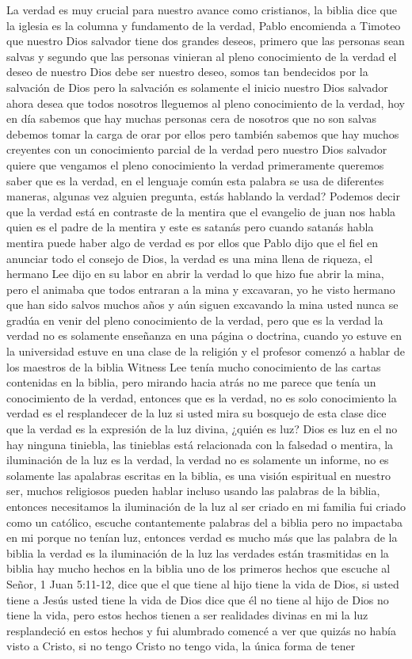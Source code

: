 \documentclass[12pt]{article}
\begin{document}
La verdad es muy crucial para nuestro avance como cristianos, la biblia dice que la iglesia es la columna y fundamento de la verdad, Pablo encomienda a Timoteo que nuestro Dios salvador tiene dos grandes deseos, primero que las personas sean salvas y segundo que las personas vinieran al pleno conocimiento de la verdad el deseo de nuestro Dios debe ser nuestro deseo, somos tan bendecidos por la salvación de Dios pero la salvación es solamente el inicio nuestro Dios salvador ahora desea que todos nosotros lleguemos al pleno conocimiento de la verdad, hoy en día sabemos que hay muchas personas cera de nosotros que no son salvas debemos tomar la carga de orar por ellos pero también sabemos que hay muchos creyentes con un conocimiento parcial de la verdad pero nuestro Dios salvador quiere que vengamos el pleno conocimiento la verdad primeramente queremos saber que es la verdad, en el lenguaje común esta palabra se usa de diferentes maneras, algunas vez alguien pregunta, estás hablando la verdad? Podemos decir que la verdad está en contraste de la mentira que el evangelio de juan nos habla quien es el padre de la mentira y este es satanás pero cuando satanás habla mentira puede haber algo de verdad es por ellos que Pablo dijo que el fiel en anunciar todo el consejo de Dios, la verdad es una mina llena de riqueza, el hermano Lee dijo en su labor en abrir la verdad lo que hizo fue abrir la mina, pero el animaba que todos entraran a la mina y excavaran, yo he visto hermano que han sido salvos muchos años y aún siguen excavando la mina usted nunca se gradúa en venir del pleno conocimiento de la verdad, pero que es la verdad la verdad no es solamente enseñanza en una página o doctrina, cuando yo estuve en la universidad estuve en una clase de la religión y el profesor comenzó a hablar de los maestros de la biblia Witness Lee tenía mucho conocimiento de las cartas contenidas en la biblia, pero mirando hacia atrás no me parece que tenía un conocimiento de la verdad, entonces que es la verdad, no es solo conocimiento la verdad es el resplandecer de la luz si usted mira su bosquejo de esta clase dice que la verdad es la expresión de la luz divina, ¿quién es luz? Dios es luz en el no hay ninguna tiniebla, las tinieblas está relacionada con la falsedad o mentira, la iluminación de la luz es la verdad, la verdad no es solamente un informe, no es solamente las apalabras escritas en la biblia, es una visión espiritual en nuestro ser, muchos religiosos pueden hablar incluso usando las palabras de la biblia, entonces necesitamos la iluminación de la luz al ser criado en mi familia fui criado como un católico, escuche contantemente palabras del a biblia pero no impactaba en mi porque no tenían luz, entonces verdad es mucho más que las palabra de la biblia la verdad es la iluminación de la luz las verdades están trasmitidas en la biblia hay mucho hechos en la biblia uno de los primeros hechos que escuche al Señor, 1 Juan 5:11-12, dice que el que tiene al hijo tiene la vida de Dios, si usted tiene a Jesús usted tiene la vida de Dios dice que él no tiene al hijo de Dios no tiene la vida, pero estos hechos tienen a ser realidades divinas en mi la luz resplandeció en estos hechos y fui alumbrado comencé a ver que quizás no había visto a Cristo, si no tengo Cristo no tengo vida, la única forma de tener 
\end{document}
